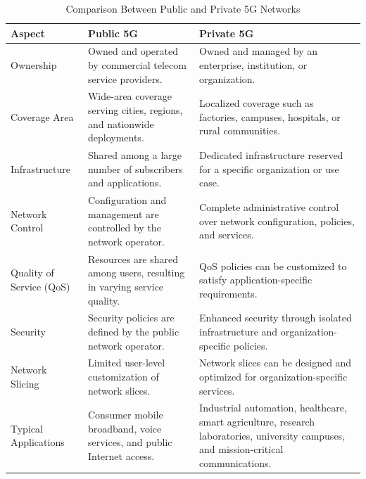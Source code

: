 \documentclass[12pt,a4paper]{report}
\begin{document}
	\begin{table}[H]
		\centering
		\caption{Comparison Between Public and Private 5G Networks}
		\label{tab:private5g}
		
		\begin{tabular}{|p{3.8cm}|p{5.2cm}|p{5.2cm}|}
			\hline
			
			\textbf{Aspect} &
			\textbf{Public 5G} &
			\textbf{Private 5G}
			\\
			\hline
			
			Ownership &
			Owned and operated by commercial telecom service providers. &
			Owned and managed by an enterprise, institution, or organization.
			\\
			\hline
			
			Coverage Area &
			Wide-area coverage serving cities, regions, and nationwide deployments. &
			Localized coverage such as factories, campuses, hospitals, or rural communities.
			\\
			\hline
			
			Infrastructure &
			Shared among a large number of subscribers and applications. &
			Dedicated infrastructure reserved for a specific organization or use case.
			\\
			\hline
			
			Network Control &
			Configuration and management are controlled by the network operator. &
			Complete administrative control over network configuration, policies, and services.
			\\
			\hline
			
			Quality of Service (QoS) &
			Resources are shared among users, resulting in varying service quality. &
			QoS policies can be customized to satisfy application-specific requirements.
			\\
			\hline
			
			Security &
			Security policies are defined by the public network operator. &
			Enhanced security through isolated infrastructure and organization-specific policies.
			\\
			\hline
			
			Network Slicing &
			Limited user-level customization of network slices. &
			Network slices can be designed and optimized for organization-specific services.
			\\
			\hline
			
			Typical Applications &
			Consumer mobile broadband, voice services, and public Internet access. &
			Industrial automation, healthcare, smart agriculture, research laboratories, university campuses, and mission-critical communications.
			\\
			\hline
			
		\end{tabular}
		
	\end{table}
	
\end{document}
